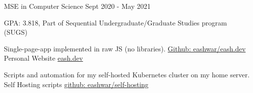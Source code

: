 \documentclass[]{awesome-cv}
\begin{document}
\vspace{-5mm}
\cventry
	{MSE in Computer Science}
	{}
	{}
	{Sept 2020 - May 2021}
	{\begin{cvitems}
		\item{GPA: 3.818, Part of Sequential Undergraduate/Graduate Studies program (SUGS)}
		\end{cvitems}}




\vspace{-2mm}




	
	\projentry
	{Single-page-app implemented in raw JS (no libraries). \href{https://github.com/eashwar/eash.dev}{Github: eashwar/eash.dev}}
	{Personal Website}
	{\href{https://eash.dev}{eash.dev}}
	{}
	{}

	\vspace{-6mm}
	\projentry
	{Scripts and automation for my self-hosted Kubernetes cluster on my home server.}
	{Self Hosting scripts}
	{\href{https://github.com/eashwar/self-hosting}{github: eashwar/self-hosting}}
	{}
	{}
\end{document}
